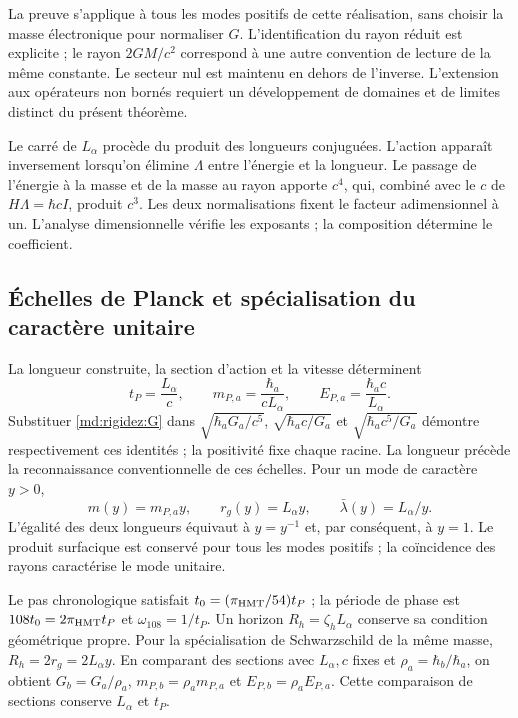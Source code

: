 La preuve s’applique à tous les modes positifs de cette réalisation, sans choisir
la masse électronique pour normaliser $G$. L’identification du rayon
réduit est explicite ; le rayon $2GM/c^2$ correspond à une autre convention
de lecture de la même constante. Le secteur nul est maintenu en dehors de
l’inverse. L’extension aux opérateurs non bornés requiert un développement de
domaines et de limites distinct du présent théorème.

Le carré de $L_\alpha$ procède du produit des longueurs conjuguées.
L’action apparaît inversement lorsqu’on élimine $\Lambda$ entre l’énergie et la
longueur. Le passage de l’énergie à la masse et de la masse au rayon apporte $c^4$,
qui, combiné avec le $c$ de $H\Lambda=\hbar cI$, produit $c^3$.
Les deux normalisations fixent le facteur adimensionnel à un. L’analyse
dimensionnelle vérifie les exposants ; la composition détermine le coefficient.

\subsection{Échelles de Planck et spécialisation du caractère unitaire}
\label{md:rigidez:escalas}

La longueur construite, la section d’action et la vitesse déterminent
\[
 t_P=\frac{L_\alpha}{c},\qquad
 m_{P,a}=\frac{\hbar_a}{cL_\alpha},\qquad
 E_{P,a}=\frac{\hbar_a c}{L_\alpha}.
\]
Substituer \eqref{md:rigidez:G} dans
$\sqrt{\hbar_aG_a/c^5}$, $\sqrt{\hbar_ac/G_a}$ et
$\sqrt{\hbar_ac^5/G_a}$ démontre respectivement ces identités ;
la positivité fixe chaque racine. La longueur précède la reconnaissance
conventionnelle de ces échelles.
Pour un mode de caractère $y>0$,
\[
 m(y)=m_{P,a}y,\qquad r_g(y)=L_\alpha y,\qquad
 \bar\lambda(y)=L_\alpha/y.
\]
L’égalité des deux longueurs équivaut à $y=y^{-1}$ et, par conséquent,
à $y=1$. Le produit surfacique est conservé pour tous les modes positifs ;
la coïncidence des rayons caractérise le mode unitaire.

Le pas chronologique satisfait $t_0=(\pi_{\rm HMT}/54)t_P$ ;
la période de phase est $108t_0=2\pi_{\rm HMT}t_P$ et
$\omega_{108}=1/t_P$. Un horizon $R_h=\zeta_hL_\alpha$ conserve
sa condition géométrique propre. Pour la spécialisation de Schwarzschild
de la même masse, $R_h=2r_g=2L_\alpha y$.
En comparant des sections avec $L_\alpha,c$ fixes et
$\rho_a=\hbar_b/\hbar_a$, on obtient
$G_b=G_a/\rho_a$, $m_{P,b}=\rho_a m_{P,a}$ et
$E_{P,b}=\rho_a E_{P,a}$. Cette comparaison de sections conserve
$L_\alpha$ et $t_P$.


